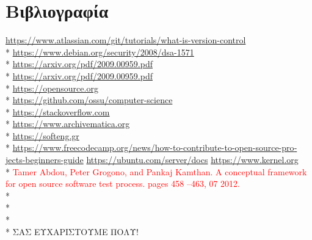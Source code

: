\documentclass[a4paper, 11pt]{article}
\begin{document}
{{\section{Βιβλιογραφία}
\textlatin{\href{https://www.atlassian.com/git/tutorials/what-is-version-control}{https://www.atlassian.com/git/tutorials/what-is-version-control}}\\*
\textlatin{\href{https://www.debian.org/security/2008/dsa-1571}{https://www.debian.org/security/2008/dsa-1571}}\\*
\textlatin{\href{https://arxiv.org/pdf/2009.00959.pdf}{https://arxiv.org/pdf/2009.00959.pdf}}\\*
\textlatin{\href{https://arxiv.org/pdf/2009.00959.pdf}{https://arxiv.org/pdf/2009.00959.pdf}}\\*
\textlatin{\href{https://opensource.org}{https://opensource.org}}\\*
\textlatin{\href{https://github.com/ossu/computer-science}{https://github.com/ossu/computer-science}}\\*
\textlatin{\href{https://stackoverflow.com}{https://stackoverflow.com}}\\*
\textlatin{\href{https://www.archivematica.org}{https://www.archivematica.org}}\\*
\textlatin{\href{https://softeng.gr}{https://softeng.gr}}\\*
\textlatin{\href{https://www.freecodecamp.org/news/how-to-contribute-to-open-source-projects-beginners-guide}{https://www.freecodecamp.org/news/how-to-contribute-to-open-source-projects-beginners-guide}}
\textlatin{\href{https://ubuntu.com/server/docs}{https://ubuntu.com/server/docs}}
\textlatin{\href{https://www.kernel.org}{https://www.kernel.org}}\\*
\textlatin{\textcolor{red}{Tamer Abdou, Peter Grogono, and Pankaj Kamthan. A conceptual framework for open source software test process. pages 458 –463, 07 2012.}}\\*
\\*
\\*
\\*
ΣΑΣ ΕΥΧΑΡΙΣΤΟΥΜΕ ΠΟΛΥ!
}} %
\end{document}
